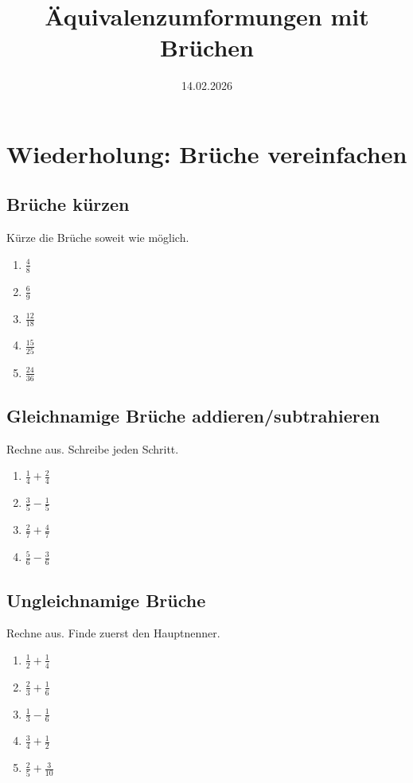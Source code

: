 \documentclass[12pt]{article}
\title{Äquivalenzumformungen mit Brüchen}
\author{}
\date{14.02.2026}
\begin{document}
\maketitle

\section*{Wiederholung: Brüche vereinfachen}

\subsection*{Brüche kürzen}
Kürze die Brüche soweit wie möglich.
\begin{enumerate}
  \item \(\frac{4}{8}\)
  \item \(\frac{6}{9}\)
  \item \(\frac{12}{18}\)
  \item \(\frac{15}{25}\)
  \item \(\frac{24}{36}\)
\end{enumerate}

\subsection*{Gleichnamige Brüche addieren/subtrahieren}
Rechne aus. Schreibe jeden Schritt.
\begin{enumerate}
  \item \(\frac{1}{4} + \frac{2}{4}\)
  \item \(\frac{3}{5} - \frac{1}{5}\)
  \item \(\frac{2}{7} + \frac{4}{7}\)
  \item \(\frac{5}{6} - \frac{3}{6}\)
\end{enumerate}

\subsection*{Ungleichnamige Brüche}
Rechne aus. Finde zuerst den Hauptnenner.
\begin{enumerate}
  \item \(\frac{1}{2} + \frac{1}{4}\)
  \item \(\frac{2}{3} + \frac{1}{6}\)
  \item \(\frac{1}{3} - \frac{1}{6}\)
  \item \(\frac{3}{4} + \frac{1}{2}\)
  \item \(\frac{2}{5} + \frac{3}{10}\)
\end{enumerate}
\end{document}
